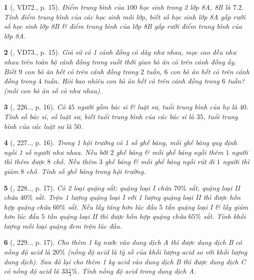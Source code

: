 \documentclass{article}
\newtheorem{baitoan}{}
\begin{document}
\begin{baitoan}[\cite{Binh_Toan_9_tap_2}, VD72., p. 15]
	Điểm trung bình của $100$ học sinh trong 2 lớp 8A, 8B là $7.2$. Tính điểm trung bình của các học sinh mỗi lớp, biết số học sinh lớp 8A gấp rưỡi số học sinh lớp 8B \& điểm trung bình của lớp 8B gấp rưỡi điểm trung bình của lớp 8A.
\end{baitoan}

\begin{baitoan}[\cite{Binh_Toan_9_tap_2}, VD73., p. 15]
	Giả sử có 1 cánh đồng cỏ dày như nhau, mọc cao đều như nhau trên toàn bộ cánh đồng trong suốt thời gian bò ăn cỏ trên cánh đồng ấy. Biết $9$ con bò ăn hết cỏ trên cánh đồng trong $2$ tuần, $6$ con bò ăn hết cỏ trên cánh đồng trong $4$ tuần. Hỏi bao nhiêu con bò ăn hết cỏ trên cánh đồng trong $6$ tuần? (mỗi con bò ăn số cỏ như nhau).
\end{baitoan}

\begin{baitoan}[\cite{Binh_Toan_9_tap_2}, 226.., p. 16]
	Có $45$ người gồm bác sĩ \& luật sư, tuổi trung bình của họ là $40$. Tính số bác sĩ, số luật sư, biết tuổi trung bình của các bác sĩ là $35$, tuổi trung bình của các luật sư là $50$.
\end{baitoan}

\begin{baitoan}[\cite{Binh_Toan_9_tap_2}, 227.., p. 16]
	Trong 1 hội trường có 1 số ghế băng, mỗi ghế băng quy định ngồi 1 số người như nhau. Nếu bớt $2$ ghế băng \& mỗi ghế băng ngồi thêm $1$ người thì thêm được $8$ chỗ. Nếu thêm $3$ ghế băng \& mỗi ghế băng ngồi rút đi $1$ người thì giảm $8$ chỗ. Tính số ghế băng trong hội trường.
\end{baitoan}

\begin{baitoan}[\cite{Binh_Toan_9_tap_2}, 228.., p. 17]
	Có 2 loại quặng sắt: quặng loại I chứa $70\%$ sắt, quặng loại II chứa $40\%$ sắt. Trộn 1 lượng quặng loại I với 1 lượng quặng loại II thì được hỗn hợp quặng chứa $60\%$ sắt. Nếu lấy tăng hơn lúc đầu $5$ tấn quặng loại I \& lấy giảm hơn lúc đầu $5$ tấn quặng loại II thì được hỗn hợp quặng chứa $65\%$ sắt. Tính khối lượng mỗi loại quặng đem trộn lúc đầu.
\end{baitoan}

\begin{baitoan}[\cite{Binh_Toan_9_tap_2}, 229.., p. 17]
	Cho thêm {\rm1 kg} nước vào dung dịch A thì được dung dịch B có nồng độ acid là $20\%$ (nồng độ acid là tỷ số của khối lượng acid so với khối lượng dung dịch). Sau đó lại cho thêm {\rm1 kg} acid vào dung dịch B thì được dung dịch C có nồng độ acid là $33\frac{1}{3}\%$. Tính nồng độ acid trong dung dịch A.
\end{baitoan}
\end{document}
